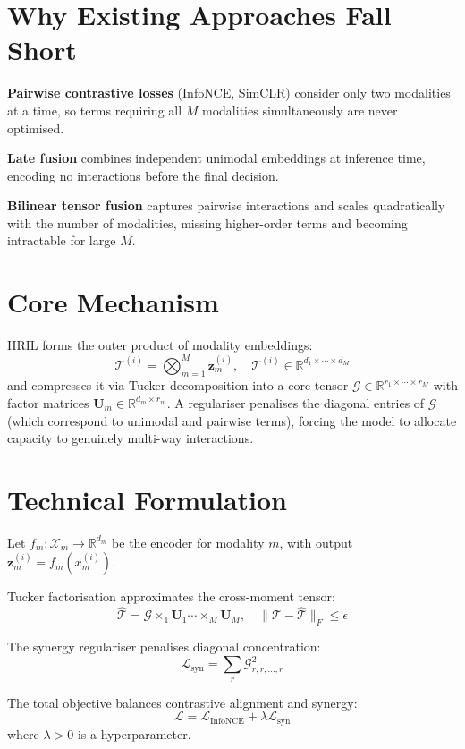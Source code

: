 \documentclass[10pt,twocolumn]{article}
\begin{document}
\section{Why Existing Approaches Fall Short}

\textbf{Pairwise contrastive losses} (InfoNCE, SimCLR) consider only two
modalities at a time, so terms requiring all $M$ modalities simultaneously
are never optimised.

\textbf{Late fusion} combines independent unimodal embeddings at inference
time, encoding no interactions before the final decision.

\textbf{Bilinear tensor fusion} captures pairwise interactions and scales
quadratically with the number of modalities, missing higher-order terms
and becoming intractable for large $M$.

\section{Core Mechanism}

HRIL forms the outer product of modality embeddings:
\[
\mathcal{T}^{(i)} = \bigotimes_{m=1}^{M} \mathbf{z}_m^{(i)},
\quad \mathcal{T}^{(i)} \in \mathbb{R}^{d_1 \times \cdots \times d_M}
\]
and compresses it via Tucker decomposition into a core tensor
$\mathcal{G} \in \mathbb{R}^{r_1 \times \cdots \times r_M}$ with factor
matrices $\mathbf{U}_m \in \mathbb{R}^{d_m \times r_m}$. A regulariser
penalises the diagonal entries of $\mathcal{G}$ (which correspond to
unimodal and pairwise terms), forcing the model to allocate capacity to
genuinely multi-way interactions.

\section{Technical Formulation}

Let $f_m : \mathcal{X}_m \to \mathbb{R}^{d_m}$ be the encoder for modality
$m$, with output $\mathbf{z}_m^{(i)} = f_m(x_m^{(i)})$.

Tucker factorisation approximates the cross-moment tensor:
\[
\hat{\mathcal{T}} = \mathcal{G} \times_1 \mathbf{U}_1 \cdots \times_M \mathbf{U}_M,
\quad \|\mathcal{T} - \hat{\mathcal{T}}\|_F \leq \epsilon
\]

The synergy regulariser penalises diagonal concentration:
\[
\mathcal{L}_\text{syn} = \sum_{r} \mathcal{G}_{r,r,\ldots,r}^2
\]

The total objective balances contrastive alignment and synergy:
\[
\mathcal{L} = \mathcal{L}_\text{InfoNCE} + \lambda \mathcal{L}_\text{syn}
\]
where $\lambda > 0$ is a hyperparameter.
\end{document}
